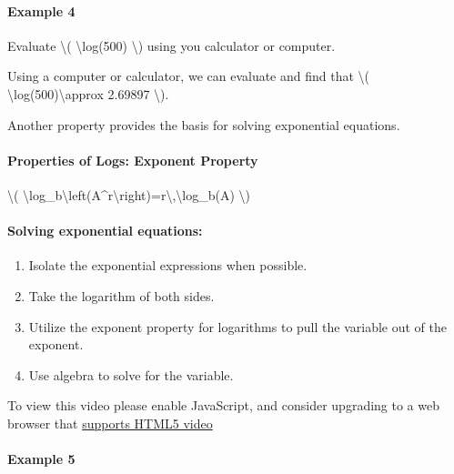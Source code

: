 \hypertarget{example-4}{%
\paragraph{Example 4}\label{example-4}}

Evaluate \textbackslash{}( \textbackslash{}log(500) \textbackslash{})
using you calculator or computer.

Using a computer or calculator, we can evaluate and find that
\textbackslash{}( \textbackslash{}log(500)\textbackslash{}approx 2.69897
\textbackslash{}).

Another property provides the basis for solving exponential equations.

\hypertarget{properties-of-logs-exponent-property}{%
\paragraph{Properties of Logs: Exponent
Property}\label{properties-of-logs-exponent-property}}

\textbackslash{}(
\textbackslash{}log\_b\textbackslash{}left(A\^{}r\textbackslash{}right)=r\textbackslash{},\textbackslash{}log\_b(A)
\textbackslash{})

\hypertarget{solving-exponential-equations}{%
\paragraph{Solving exponential
equations:}\label{solving-exponential-equations}}

\begin{enumerate}
\tightlist
\item
  Isolate the exponential expressions when possible.
\item
  Take the logarithm of both sides.
\item
  Utilize the exponent property for logarithms to pull the variable out
  of the exponent.
\item
  Use algebra to solve for the variable.
\end{enumerate}

To view this video please enable JavaScript, and consider upgrading to a
web browser that \href{http://videojs.com/html5-video-support/}{supports
HTML5 video}

\hypertarget{example-5}{%
\paragraph{Example 5}\label{example-5}}

